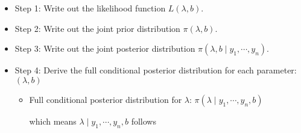 \documentclass[11pt]{article}
\begin{document}
\begin{itemize}
\item Step 1: Write out the likelihood function $L(\lambda, b)$.
\vspace{20mm}

\item Step 2: Write out the joint prior distribution $\pi(\lambda, b) $.
\vspace{20mm}

\item Step 3: Write out the joint posterior distribution $\pi(\lambda, b \mid y_1, \cdots, y_n)$.
\vspace{20mm}
\newpage
\item Step 4: Derive the full conditional posterior distribution for each parameter: $(\lambda, b)$
\begin{itemize}
\item Full conditional posterior distribution for $\lambda$: $\pi(\lambda \mid y_1, \cdots, y_n, b)$
\vspace{10mm}

which means $\lambda \mid y_1, \cdots, y_n, b$ follows
\vspace{10mm}


\end{itemize}
\end{itemize}
\end{document}
